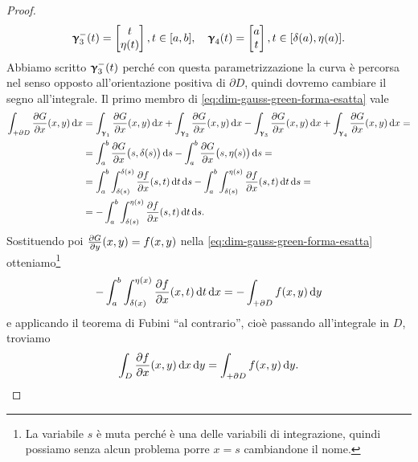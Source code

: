 \begin{proof}
\begin{gather*}
		\bm{\upgamma}_3^-(t)=
		\begin{bmatrix}
			t\\\eta(t)
		\end{bmatrix}, t\in[a,b],\quad 
		\bm{\upgamma}_4(t)=
		\begin{bmatrix}
			a\\t
		\end{bmatrix}, t\in[\delta(a),\eta(a)].
	\end{gather*}
	Abbiamo scritto $\bm{\upgamma}_3^-(t)$ perché con questa parametrizzazione la curva è percorsa nel senso opposto all'orientazione positiva di $\partial D$, quindi dovremo cambiare il segno all'integrale.
	Il primo membro di \eqref{eq:dim-gauss-green-forma-esatta} vale
	\begin{equation}
		\begin{split}
			\int_{+\partial D}\frac{\partial {G}}{\partial {x}}(x,y)\,\textup{d} x&=\int_{\bm{\upgamma}_1}\frac{\partial {G}}{\partial {x}}(x,y)\,\textup{d} x+\int_{\bm{\upgamma}_2}\frac{\partial {G}}{\partial {x}}(x,y)\,\textup{d} x-\int_{\bm{\upgamma}_3}\frac{\partial {G}}{\partial {x}}(x,y)\,\textup{d} x+\int_{\bm{\upgamma}_4}\frac{\partial {G}}{\partial {x}}(x,y)\,\textup{d} x=\\
			&=\int_a^b\frac{\partial {G}}{\partial {x}}\big(s,\delta(s)\big)\,\textup{d} s-\int_a^b\frac{\partial {G}}{\partial {x}}\big(s,\eta(s)\big)\,\textup{d} s=\\
			&=\int_a^b\int_{\delta(s)}^{\delta(s)}\frac{\partial {f}}{\partial {x}}(s,t)\,\textup{d} t\,\textup{d} s-\int_a^b\int_{\delta(s)}^{\eta(s)}\frac{\partial {f}}{\partial {x}}(s,t)\,\textup{d} t\,\textup{d} s=\\
			&=-\int_a^b\int_{\delta(s)}^{\eta(s)}\frac{\partial {f}}{\partial {x}}(s,t)\,\textup{d} t\,\textup{d} s.
		\end{split}
	\end{equation}
	Sostituendo poi $\frac{\partial {G}}{\partial {y}}(x,y)=f(x,y)$ nella \eqref{eq:dim-gauss-green-forma-esatta} otteniamo\footnote{La variabile $s$ è muta perché è una delle variabili di integrazione, quindi possiamo senza alcun problema porre $x=s$ cambiandone il nome.}
	\begin{equation}
		-\int_a^b\int_{\delta(x)}^{\eta(x)}\frac{\partial {f}}{\partial {x}}(x,t)\,\textup{d} t\,\textup{d} x=-\int_{+\partial D}f(x,y)\,\textup{d} y
	\end{equation}
	e applicando il teorema di Fubini ``al contrario'', cioè passando all'integrale in $D$, troviamo
	\begin{equation}
		\int_D\frac{\partial {f}}{\partial {x}}(x,y)\,\textup{d} x\,\textup{d} y=\int_{+\partial D}f(x,y)\,\textup{d} y.
	\end{equation}


\end{proof}
